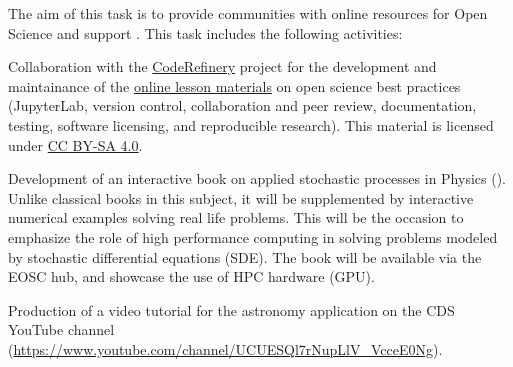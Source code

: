 \begin{task}[
  title=Online resources for open science,
  id=online-resources,
  lead=INSERM,
  PM=14,
  wphases={0-48},
  partners={CDS,EP,QS,SIL,SRL,UPSUD,WTT,XFEL}
]
  The aim of this task is to provide communities with online resources for Open Science and support .
  This task includes the following activities:
  \begin{compactitem}
  \item Collaboration with the \href{https://coderefinery.org}{CodeRefinery} project for the development and maintainance of the \href{https://coderefinery.org/lessons/}{online lesson materials} on open science best practices (JupyterLab, version control, collaboration and peer review, documentation, testing, software licensing, and reproducible research).
  This material is licensed under \href{https://creativecommons.org/licenses/by-sa/4.0/}{CC BY-SA 4.0}.
\item Development of an interactive book on applied stochastic
  processes in Physics (). Unlike classical
  books in this subject, it will be supplemented by interactive
  numerical examples solving real life problems. This will be the
  occasion to emphasize the role of high performance computing in
  solving problems modeled by stochastic differential equations (SDE).
  The book will be available via the EOSC hub, and showcase the use of
  HPC hardware (GPU).
  \item Production of a video tutorial for the astronomy application on the 
      CDS YouTube channel (\url{https://www.youtube.com/channel/UCUESQl7rNupLlV_VcceE0Ng}).
  \end{compactitem}
\end{task}
